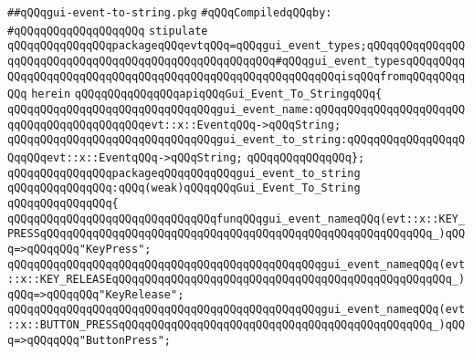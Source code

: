 \label{src/lib/x-kit/widget/gui/gui-event-to-string.pkg}
\verb|##qQQqgui-event-to-string.pkg|\newline
\newline
\verb|#qQQqCompiledqQQqby:|\newline
\verb|#qQQqqQQqqQQqqQQqqQQq|\newline
\newline
\newline
\verb|stipulate|\newline
\verb|qQQqqQQqqQQqqQQqpackageqQQqevtqQQq=qQQqgui_event_types;qQQqqQQqqQQqqQQqqQQqqQQqqQQqqQQqqQQqqQQqqQQqqQQqqQQqqQQq#qQQqgui_event_typesqQQqqQQqqQQqqQQqqQQqqQQqqQQqqQQqqQQqqQQqqQQqqQQqqQQqqQQqqQQqisqQQqfromqQQqqQQqqQQq|\newline
\verb|herein|\newline
\newline
\verb|qQQqqQQqqQQqqQQqapiqQQqGui_Event_To_StringqQQq{|\newline
\verb|qQQqqQQqqQQqqQQqqQQqqQQqqQQqqQQqgui_event_name:qQQqqQQqqQQqqQQqqQQqqQQqqQQqqQQqqQQqqQQqqQQqevt::x::EventqQQq->qQQqString;|\newline
\verb|qQQqqQQqqQQqqQQqqQQqqQQqqQQqqQQqgui_event_to_string:qQQqqQQqqQQqqQQqqQQqqQQqevt::x::EventqQQq->qQQqString;|\newline
\verb|qQQqqQQqqQQqqQQq};|\newline
\newline
\newline
\verb|qQQqqQQqqQQqqQQqpackageqQQqqQQqqQQqgui_event_to_string|\newline
\verb|qQQqqQQqqQQqqQQq:qQQq(weak)qQQqqQQqGui_Event_To_String|\newline
\verb|qQQqqQQqqQQqqQQq{|\newline
\verb|qQQqqQQqqQQqqQQqqQQqqQQqqQQqqQQqfunqQQqgui_event_nameqQQq(evt::x::KEY_PRESSqQQqqQQqqQQqqQQqqQQqqQQqqQQqqQQqqQQqqQQqqQQqqQQqqQQqqQQqqQQq_)qQQq=>qQQqqQQq"KeyPress";|\newline
\verb|qQQqqQQqqQQqqQQqqQQqqQQqqQQqqQQqqQQqqQQqqQQqqQQqgui_event_nameqQQq(evt::x::KEY_RELEASEqQQqqQQqqQQqqQQqqQQqqQQqqQQqqQQqqQQqqQQqqQQqqQQqqQQq_)qQQq=>qQQqqQQq"KeyRelease";|\newline
\verb|qQQqqQQqqQQqqQQqqQQqqQQqqQQqqQQqqQQqqQQqqQQqqQQqgui_event_nameqQQq(evt::x::BUTTON_PRESSqQQqqQQqqQQqqQQqqQQqqQQqqQQqqQQqqQQqqQQqqQQqqQQq_)qQQq=>qQQqqQQq"ButtonPress";|\newline
